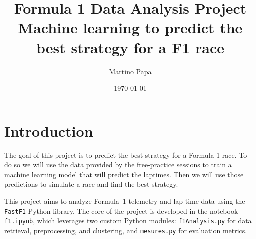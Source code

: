 \documentclass[12pt,a4paper]{article}
\title{Formula 1 Data Analysis Project \\
    \large Machine learning to predict the best strategy for a F1 race
}
\author{Martino Papa}
\date{\today}
\begin{document}
\maketitle

\section{Introduction}
The goal of this project is to predict the best strategy for a Formula 1 race. To do so we will use the data provided by the free-practice sessions to train a machine learning model that will predict the laptimes. Then we will use those predictions to simulate a race and find the best strategy.  

This project aims to analyze Formula~1 telemetry and lap time data using the \texttt{FastF1} Python library.
The core of the project is developed in the notebook \texttt{f1.ipynb}, which leverages two custom Python modules: 
\texttt{f1Analysis.py} for data retrieval, preprocessing, and clustering, and \texttt{mesures.py} for evaluation metrics.
\end{document}
